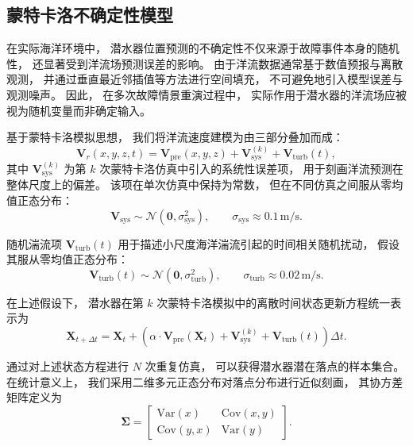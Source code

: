 \documentclass{mcmthesis}
\begin{document}
\vspace{0.5em}
\subsection{蒙特卡洛不确定性模型}
在实际海洋环境中，
潜水器位置预测的不确定性不仅来源于故障事件本身的随机性，
还显著受到洋流场预测误差的影响。
由于洋流数据通常基于数值预报与离散观测，
并通过垂直最近邻插值等方法进行空间填充，
不可避免地引入模型误差与观测噪声。
因此，
在多次故障情景重演过程中，
实际作用于潜水器的洋流场应被视为随机变量而非确定输入。

基于蒙特卡洛模拟思想，
我们将洋流速度建模为由三部分叠加而成：
\begin{equation}
\mathbf{V}_r(x,y,z,t)
=
\mathbf{V}_{\mathrm{pre}}(x,y,z)
+
\mathbf{V}_{\mathrm{sys}}^{(k)}
+
\mathbf{V}_{\mathrm{turb}}(t),
\end{equation}
其中
$\mathbf{V}_{\mathrm{sys}}^{(k)}$ 为第 $k$ 次蒙特卡洛仿真中引入的系统性误差项，
用于刻画洋流预测在整体尺度上的偏差。
该项在单次仿真中保持为常数，
但在不同仿真之间服从零均值正态分布：
\begin{equation}
\mathbf{V}_{\mathrm{sys}}
\sim
\mathcal{N}\!\left( \mathbf{0}, \sigma_{\mathrm{sys}}^{2} \right),
\qquad
\sigma_{\mathrm{sys}} \approx 0.1\,\mathrm{m/s}.
\end{equation}

随机湍流项 $\mathbf{V}_{\mathrm{turb}}(t)$
用于描述小尺度海洋湍流引起的时间相关随机扰动，
假设其服从零均值正态分布：
\begin{equation}
\mathbf{V}_{\mathrm{turb}}(t)
\sim
\mathcal{N}\!\left( \mathbf{0}, \sigma_{\mathrm{turb}}^{2} \right),
\qquad
\sigma_{\mathrm{turb}} \approx 0.02\,\mathrm{m/s}.
\end{equation}

在上述假设下，
潜水器在第 $k$ 次蒙特卡洛模拟中的离散时间状态更新方程统一表示为
\begin{equation}
\mathbf{X}_{t+\Delta t}
=
\mathbf{X}_t
+
\left(
\alpha \cdot \mathbf{V}_{\mathrm{pre}}(\mathbf{X}_t)
+
\mathbf{V}_{\mathrm{sys}}^{(k)}
+
\mathbf{V}_{\mathrm{turb}}(t)
\right)\Delta t.
\end{equation}

通过对上述状态方程进行 $N$ 次重复仿真，
可以获得潜水器潜在落点的样本集合。
在统计意义上，
我们采用二维多元正态分布对落点分布进行近似刻画，
其协方差矩阵定义为
\begin{equation}
\mathbf{\Sigma}
=
\begin{bmatrix}
\mathrm{Var}(x) & \mathrm{Cov}(x,y) \\
\mathrm{Cov}(y,x) & \mathrm{Var}(y)
\end{bmatrix}.
\end{equation}
\end{document}
